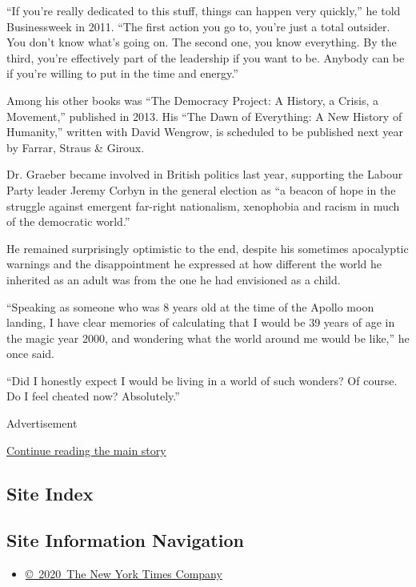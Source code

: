 ``If you're really dedicated to this stuff, things can happen very
quickly,'' he told Businessweek in 2011. ``The first action you go to,
you're just a total outsider. You don't know what's going on. The second
one, you know everything. By the third, you're effectively part of the
leadership if you want to be. Anybody can be if you're willing to put in
the time and energy.''

Among his other books was ``The Democracy Project: A History, a Crisis,
a Movement,'' published in 2013. His ``The Dawn of Everything: A New
History of Humanity,'' written with David Wengrow, is scheduled to be
published next year by Farrar, Straus \& Giroux.

Dr. Graeber became involved in British politics last year, supporting
the Labour Party leader Jeremy Corbyn in the general election as ``a
beacon of hope in the struggle against emergent far-right nationalism,
xenophobia and racism in much of the democratic world.''

He remained surprisingly optimistic to the end, despite his sometimes
apocalyptic warnings and the disappointment he expressed at how
different the world he inherited as an adult was from the one he had
envisioned as a child.

``Speaking as someone who was 8 years old at the time of the Apollo moon
landing, I have clear memories of calculating that I would be 39 years
of age in the magic year 2000, and wondering what the world around me
would be like,'' he once said.

``Did I honestly expect I would be living in a world of such wonders? Of
course. Do I feel cheated now? Absolutely.''

Advertisement

\protect\hyperlink{after-bottom}{Continue reading the main story}

\hypertarget{site-index}{%
\subsection{Site Index}\label{site-index}}

\hypertarget{site-information-navigation}{%
\subsection{Site Information
Navigation}\label{site-information-navigation}}

\begin{itemize}
\tightlist
\item
  \href{https://help.nytimes3xbfgragh.onion/hc/en-us/articles/115014792127-Copyright-notice}{©~2020~The
  New York Times Company}
\end{itemize}

